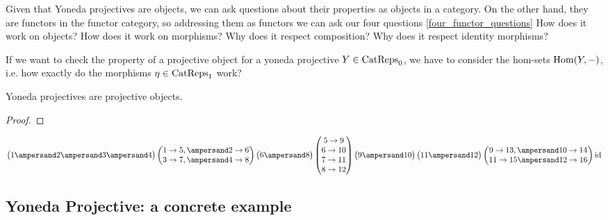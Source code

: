 Given that Yoneda projectives are objects, we can ask questions about their properties as objects in a category. On the other hand, they are
functors in the functor category, so addressing them as functors we can ask our four questions \ref{four_functor_questions} 
How does it work on objects? How does it work on morphisms? Why does it respect composition? Why does it respect identity morphisms?

If we want to check the property of a projective object for a yoneda projective $Y \in \textup{CatReps}_{0}$, we have to consider the
hom-sets $\textup{Hom}(Y,-)$, i.e. how exactly do the morphisms $\eta \in \textup{CatReps}_{1}$ work?


\begin{lemma}
Yoneda projectives are projective objects.
\begin{proof}
\end{proof}
\end{lemma}

\[
\begin{pmatrix}1 \ampersand 2 \ampersand 3 \ampersand 4\end{pmatrix}
\begin{pmatrix} 1\to5, \ampersand 2\to6 \\ 3\to7, \ampersand 4\to8 \end{pmatrix}
\begin{pmatrix}6 \ampersand 8\end{pmatrix}
\begin{pmatrix}5\to9\\6\to10\\7\to11\\8\to12\end{pmatrix}
\begin{pmatrix}9\ampersand10\end{pmatrix}\begin{pmatrix}11\ampersand12\end{pmatrix}
\begin{pmatrix}9\to13, \ampersand 10\to14\\11\to15 \ampersand 12\to16\end{pmatrix}
\textup{id}
\]

\subsection{Yoneda Projective: a concrete example}

